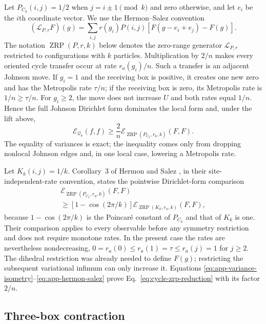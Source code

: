 Let $P_{C_k}(i,j)=1/2$ when $j=i\pm1\pmod k$ and zero otherwise, and let
$e_i$ be the $i$th coordinate vector.  We use the Hermon--Salez convention
\begin{equation}
 (\mathcal L_{P,r}F)(g)
 =\sum_{i,j}r(g_i)P(i,j)
 [F(g-e_i+e_j)-F(g)].
 \label{eq:app-zrp-generator}
\end{equation}
The notation $\operatorname{ZRP}(P,r,k)$ below denotes the zero-range generator
$\mathcal L_{P,r}$ restricted to configurations with $k$ particles.
Multiplication by $2/n$ makes every oriented cycle transfer occur at rate
$r_a(g_i)/n$.  Such a transfer is an adjacent Johnson move.  If $g_i=1$
and the receiving box is positive, it creates one new zero and has the
Metropolis rate $\tau/n$; if the receiving box is zero, its Metropolis rate
is $1/n\geq\tau/n$.  For $g_i\geq2$, the move does not increase $U$ and
both rates equal $1/n$.  Hence the full Johnson Dirichlet form dominates
the local form and, under the lift above,
\begin{equation}
 \mathcal E_{\mathcal Q_a}(f,f)
 \geq\frac2n
 \mathcal E_{\operatorname{ZRP}(P_{C_k},r_a,k)}(F,F).
 \label{eq:app-local-domination}
\end{equation}
The equality of variances is exact; the inequality comes only from dropping
nonlocal Johnson edges and, in one local case, lowering a Metropolis rate.

Let $K_k(i,j)=1/k$.  Corollary~3 of Hermon and Salez
\cite{HermonSalez2019}, in their site-independent-rate convention, states
the pointwise Dirichlet-form comparison
\begin{multline}
 \mathcal E_{\operatorname{ZRP}(P_{C_k},r_a,k)}(F,F)\\
 \geq[1-\cos(2\pi/k)]
 \mathcal E_{\operatorname{ZRP}(K_k,r_a,k)}(F,F),
 \label{eq:app-hermon-salez}
\end{multline}
because $1-\cos(2\pi/k)$ is the Poincar\'e constant of $P_{C_k}$ and that
of $K_k$ is one.  Their comparison applies to every observable before any
symmetry restriction and does not require monotone rates.  In the present
case the rates are nevertheless nondecreasing,
$0=r_a(0)\leq r_a(1)=\tau\leq r_a(j)=1$ for $j\geq2$.  The dihedral
restriction was already needed to define $F(g)$; restricting the subsequent
variational infimum can only increase it.  Equations
\eqref{eq:app-variance-isometry}--\eqref{eq:app-hermon-salez} prove
Eq.~\eqref{eq:cycle-zrp-reduction} with its factor $2/n$.

\subsection{Three-box contraction}
\label{app:three-box-proof}

